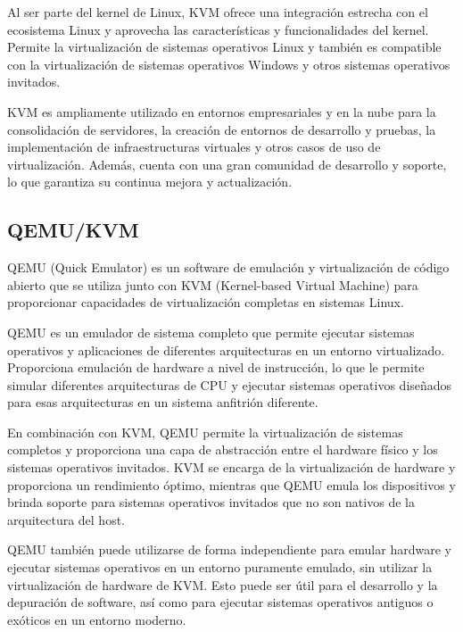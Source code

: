 				Al ser parte del kernel de Linux, KVM ofrece una integración estrecha con el ecosistema Linux y aprovecha las características y funcionalidades del kernel. Permite la virtualización de sistemas operativos Linux y también es compatible con la virtualización de sistemas operativos Windows y otros sistemas operativos invitados.\par
		
				KVM es ampliamente utilizado en entornos empresariales y en la nube para la consolidación de servidores, la creación de entornos de desarrollo y pruebas, la implementación de infraestructuras virtuales y otros casos de uso de virtualización. Además, cuenta con una gran comunidad de desarrollo y soporte, lo que garantiza su continua mejora y actualización.\par
				
		
			\subsection{QEMU/KVM}
		
				QEMU (Quick Emulator) es un software de emulación y virtualización de código abierto que se utiliza junto con KVM (Kernel-based Virtual Machine) para proporcionar capacidades de virtualización completas en sistemas Linux.\par
		
				QEMU es un emulador de sistema completo que permite ejecutar sistemas operativos y aplicaciones de diferentes arquitecturas en un entorno virtualizado. Proporciona emulación de hardware a nivel de instrucción, lo que le permite simular diferentes arquitecturas de CPU y ejecutar sistemas operativos diseñados para esas arquitecturas en un sistema anfitrión diferente.\par
		
				En combinación con KVM, QEMU permite la virtualización de sistemas completos y proporciona una capa de abstracción entre el hardware físico y los sistemas operativos invitados. KVM se encarga de la virtualización de hardware y proporciona un rendimiento óptimo, mientras que QEMU emula los dispositivos y brinda soporte para sistemas operativos invitados que no son nativos de la arquitectura del host.\par
		
				QEMU también puede utilizarse de forma independiente para emular hardware y ejecutar sistemas operativos en un entorno puramente emulado, sin utilizar la virtualización de hardware de KVM. Esto puede ser útil para el desarrollo y la depuración de software, así como para ejecutar sistemas operativos antiguos o exóticos en un entorno moderno.\par
		
